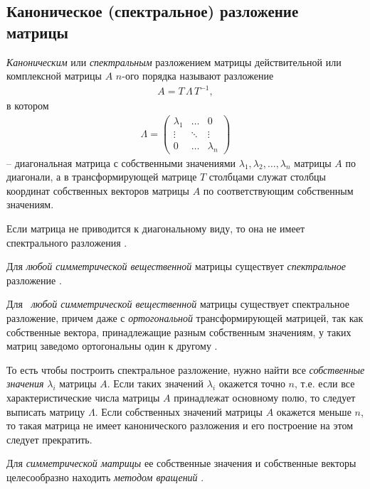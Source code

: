 \documentclass[%
	11pt,
	a4paper,
	utf8,
		]{article}
\begin{document}
\subsection{Каноническое (спектральное) разложение матрицы}

\emph{Каноническим} или \emph{спектральным} разложением матрицы действительной или комплексной матрицы $ A $ $ n $-ого порядка называют разложение \cite[]{shevtsov:linal-2012}
\begin{align*}
	A = T \, \Lambda \, T^{-1},
\end{align*}
в котором
\begin{align*}
	\Lambda = \begin{pmatrix}
		\lambda_1 & \ldots & 0 \\
		\vdots & \ddots & \vdots \\
		0 & \ldots & \lambda_n
	\end{pmatrix}
\end{align*}
-- диагональная матрица с собственными значениями $ \lambda_1, \lambda_2, \ldots, \lambda_n $ матрицы $ A $ по диагонали, а в трансформирующей матрице $ T $ столбцами служат столбцы координат собственных векторов матрицы $ A $ по соответствующим собственным значениям.

Если матрица не приводится к диагональному виду, то она не имеет спектрального разложения \cite[]{shevtsov:linal-2012}.

Для \emph{любой симметрической вещественной} матрицы существует \emph{спектральное} разложение \cite[]{goodfellow:ml-2018}.

Для  \emph{любой симметрической вещественной} матрицы существует спектральное разложение, причем даже с \emph{ортогональной} трансформирующей матрицей, так как собственные вектора, принадлежащие разным собственным значениям, у таких матриц заведомо ортогональны один к другому \cite[]{shevtsov:linal-2012}.

То есть чтобы построить спектральное разложение, нужно найти все \emph{собственные значения} $ \lambda_i $ матрицы  $ A $. Если таких значений $ \lambda_i $ окажется точно $ n $, т.е. если все характеристические числа матрицы $ A $ принадлежат основному полю, то следует выписать матрицу $ \Lambda $. Если собственных значений матрицы $ A $ окажется меньше $ n $, то такая матрица не имеет канонического разложения и его построение на этом следует прекратить. 

Для \emph{симметрической матрицы} ее собственные значения и собственные векторы целесообразно находить \emph{методом вращений} \cite[]{shevtsov:linal-2012}.
\end{document}
